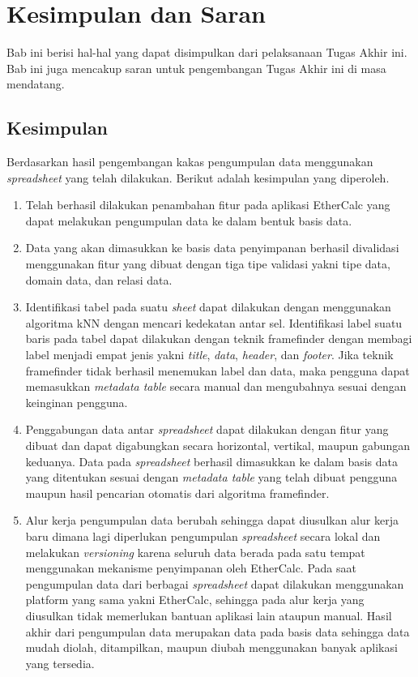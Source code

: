 \chapter{Kesimpulan dan Saran}
Bab ini berisi hal-hal yang dapat disimpulkan dari pelaksanaan Tugas Akhir ini. Bab ini juga mencakup saran untuk pengembangan Tugas Akhir ini di masa mendatang.

\section{Kesimpulan}
Berdasarkan hasil pengembangan kakas pengumpulan data menggunakan \textit{spreadsheet} yang telah dilakukan. Berikut adalah kesimpulan yang diperoleh.
\begin{enumerate}
	\item Telah berhasil dilakukan penambahan fitur pada aplikasi EtherCalc yang dapat melakukan pengumpulan data ke dalam bentuk basis data.
	\item Data yang akan dimasukkan ke basis data penyimpanan berhasil divalidasi menggunakan fitur yang dibuat dengan tiga tipe validasi yakni tipe data, domain data, dan relasi data.
	\item Identifikasi tabel pada suatu \textit{sheet} dapat dilakukan dengan menggunakan algoritma kNN dengan mencari kedekatan antar sel. Identifikasi label suatu baris pada tabel dapat dilakukan dengan teknik framefinder dengan membagi label menjadi empat jenis yakni \textit{title}, \textit{data}, \textit{header}, dan \textit{footer}. Jika teknik framefinder tidak berhasil menemukan label dan data, maka pengguna dapat memasukkan \textit{metadata table} secara manual dan mengubahnya sesuai dengan keinginan pengguna.
	\item Penggabungan data antar \textit{spreadsheet} dapat dilakukan dengan fitur yang dibuat dan dapat digabungkan secara horizontal, vertikal, maupun gabungan keduanya. Data pada \textit{spreadsheet} berhasil dimasukkan ke dalam basis data yang ditentukan sesuai dengan \textit{metadata table} yang telah dibuat pengguna maupun hasil pencarian otomatis dari algoritma framefinder.
	\item Alur kerja pengumpulan data berubah sehingga dapat diusulkan alur kerja baru dimana lagi diperlukan pengumpulan \textit{spreadsheet} secara lokal dan melakukan \textit{versioning} karena seluruh data berada pada satu tempat menggunakan mekanisme penyimpanan oleh EtherCalc. Pada saat pengumpulan data dari berbagai \textit{spreadsheet} dapat dilakukan menggunakan platform yang sama yakni EtherCalc, sehingga pada alur kerja yang diusulkan tidak memerlukan bantuan aplikasi lain ataupun manual. Hasil akhir dari pengumpulan data merupakan data pada basis data sehingga data mudah diolah, ditampilkan, maupun diubah menggunakan banyak aplikasi yang tersedia.
\end{enumerate}

